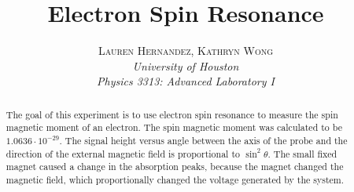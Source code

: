 \documentclass[twoside,10pt]{article}
\title{\vspace{-15mm}\fontsize{15pt}{10pt}\selectfont\textbf{Electron Spin Resonance}} %
\author{
	\small
	\textsc{Lauren Hernandez, Kathryn Wong}\\[1mm] %
	\normalsize \textit{University of Houston}\\ %
	\normalsize \textit{Physics 3313: Advanced Laboratory I}\\ %
	\vspace{-10mm}
}
\date{}
\begin{document}
	
	\maketitle %
	
	\thispagestyle{fancy} %
	
	
	\begin{abstract}
		
		\noindent The goal of this experiment is to use electron spin resonance to measure the spin magnetic moment of an electron. The spin magnetic moment was calculated to be $1.0636 \cdot 10^{-29}$. The signal height versus angle between the axis of the probe and the direction of the external magnetic field is proportional to $\sin^2\theta$. The small fixed magnet caused a change in the absorption peaks, because the magnet changed the magnetic field, which proportionally changed the voltage generated by the system.
		
		
	\end{abstract}
	
	
\end{document}
